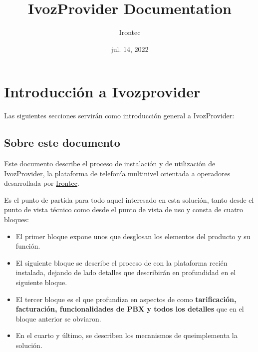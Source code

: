 \documentclass[letterpaper,10pt,spanish]{sphinxmanual}
\title{IvozProvider Documentation}
\date{jul. 14, 2022}
\author{Irontec}
\begin{document}
\maketitle
\tableofcontents
{}\label{index::doc}



\chapter{Introducción a Ivozprovider}
\label{intro/index::doc}\label{intro/index:introduction-to-ivozprovider}\label{intro/index:ivozprovider-official-documentation}
Las siguientes secciones servirán como introducción general a IvozProvider:


\section{Sobre este documento}
\label{intro/about:about-this-document}\label{intro/about::doc}
Este documento describe el proceso de instalación y de utilización de IvozProvider, la plataforma de telefonía multinivel orientada a operadores desarrollada por \href{http://irontec.com}{Irontec}.

Es el punto de partida para todo aquel interesado en esta solución, tanto desde el punto de vista técnico como desde el punto de vista de uso y consta de cuatro bloques:
\begin{itemize}
\item {} 
El primer bloque expone unos {\hyperref[index:concepts]{}} que desglosan los elementos del producto y su función.

\item {} 
El siguiente bloque se describe el proceso de {\hyperref[index:installation]{}} con la plataforma recién instalada, dejando de lado detalles que describirán en profundidad en el siguiente bloque.

\item {} 
El tercer bloque es el que profundiza en aspectos de {\hyperref[index:advanced]{}} como \textbf{tarificación, facturación, funcionalidades de PBX y todos los detalles} que en el bloque anterior se obviaron.

\item {} 
En el cuarto y último, se describen los mecanismos de {\hyperref[index:security]{}} queimplementa la solución.

\end{itemize}
\end{document}
